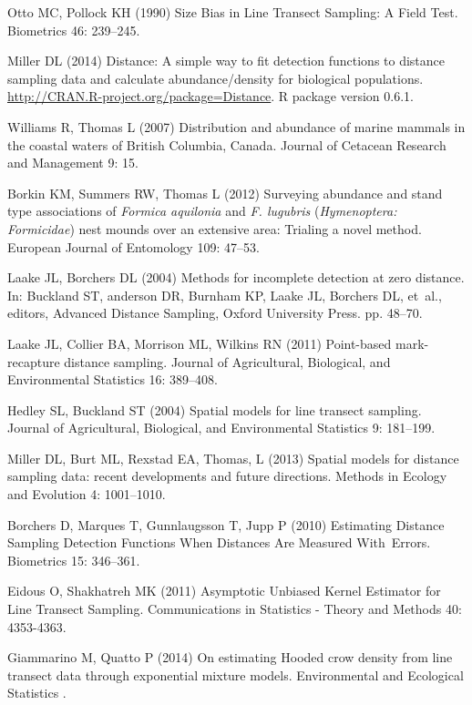 \documentclass[10pt]{article}
\begin{document}
\begin{thebibliography}{10}
Otto MC, Pollock KH (1990) {Size Bias in Line Transect Sampling: A Field Test}.
\newblock Biometrics 46: 239--245.

Miller DL (2014) Distance: A simple way to fit detection functions to distance
  sampling data and calculate abundance/density for biological populations.
\newblock \urlprefix\url{http://CRAN.R-project.org/package=Distance}.
\newblock R package version 0.6.1.

Williams R, Thomas L (2007) {Distribution and abundance of marine mammals in
  the coastal waters of British Columbia, Canada}.
\newblock Journal of Cetacean Research and Management 9: 15.

Borkin KM, Summers RW, Thomas L (2012) {Surveying abundance and stand type
  associations of \emph{Formica aquilonia} and \emph{F. lugubris}
  (\emph{Hymenoptera: Formicidae}) nest mounds over an extensive area: Trialing
  a novel method}.
\newblock European Journal of Entomology 109: 47--53.

Laake JL, Borchers DL (2004) {Methods for incomplete detection at zero
  distance}.
\newblock In: Buckland ST, anderson DR, Burnham KP, Laake JL, Borchers DL,
  et~al., editors, Advanced Distance Sampling, Oxford University Press. pp.
  48--70.

Laake JL, Collier BA, Morrison ML, Wilkins RN (2011) {Point-based
  mark-recapture distance sampling}.
\newblock Journal of Agricultural, Biological, and Environmental Statistics 16:
  389--408.

Hedley SL, Buckland ST (2004) {Spatial models for line transect sampling}.
\newblock Journal of Agricultural, Biological, and Environmental Statistics 9:
  181--199.

Miller DL, Burt ML, Rexstad EA, Thomas, L (2013) {Spatial models for distance sampling
  data: recent developments and future directions}.
\newblock Methods in Ecology and Evolution 4: 1001--1010.

Borchers D, Marques T, Gunnlaugsson T, Jupp P (2010) {Estimating Distance
  Sampling Detection Functions When Distances Are Measured With~Errors}.
\newblock Biometrics 15: 346--361.

Eidous O, Shakhatreh MK (2011) {Asymptotic Unbiased Kernel Estimator for Line
  Transect Sampling}.
\newblock Communications in Statistics - Theory and Methods 40: 4353-4363.

Giammarino M, Quatto P (2014) {On estimating Hooded crow density from line
  transect data through exponential mixture models}.
\newblock Environmental and Ecological Statistics .

\end{thebibliography}
\end{document}
